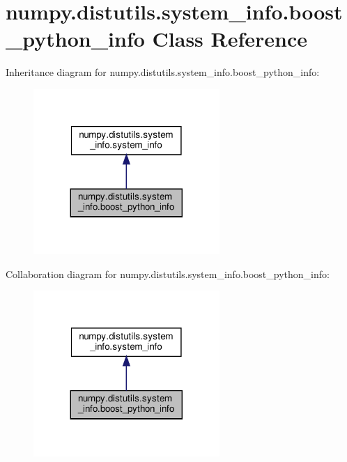 \hypertarget{classnumpy_1_1distutils_1_1system__info_1_1boost__python__info}{}\section{numpy.\+distutils.\+system\+\_\+info.\+boost\+\_\+python\+\_\+info Class Reference}
\label{classnumpy_1_1distutils_1_1system__info_1_1boost__python__info}


Inheritance diagram for numpy.\+distutils.\+system\+\_\+info.\+boost\+\_\+python\+\_\+info\+:
\nopagebreak
\begin{figure}[H]
\begin{center}
\leavevmode
\includegraphics[width=200pt]{classnumpy_1_1distutils_1_1system__info_1_1boost__python__info__inherit__graph}
\end{center}
\end{figure}


Collaboration diagram for numpy.\+distutils.\+system\+\_\+info.\+boost\+\_\+python\+\_\+info\+:
\nopagebreak
\begin{figure}[H]
\begin{center}
\leavevmode
\includegraphics[width=200pt]{classnumpy_1_1distutils_1_1system__info_1_1boost__python__info__coll__graph}
\end{center}
\end{figure}
